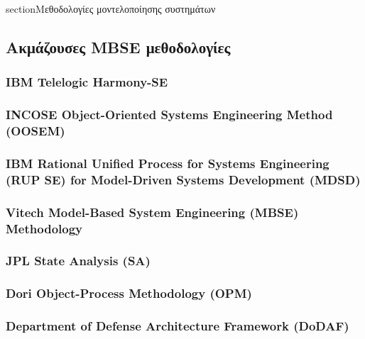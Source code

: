 \documentclass[a4paper,12pt,twoside]{report}
\begin{document}
	section{Μεθοδολογίες μοντελοποίησης συστημάτων}
		\label{κεφ.:Μεθοδολογίες μοντελοποίησης συστημάτων}

		\subsection{Ακμάζουσες MBSE μεθοδολογίες}
		
			\subsubsection{IBM Telelogic Harmony-SE}
			\subsubsection{INCOSE Object-Oriented Systems Engineering Method (OOSEM)}
			\subsubsection{IBM Rational Unified Process for Systems Engineering (RUP SE) for Model-Driven Systems Development (MDSD)}
			\subsubsection{Vitech Model-Based System Engineering (MBSE) Methodology}
			\subsubsection{JPL State Analysis (SA)}
			\subsubsection{Dori Object-Process Methodology (OPM)}
			\subsubsection{Department of Defense Architecture Framework (DoDAF)}
	
\end{document}
